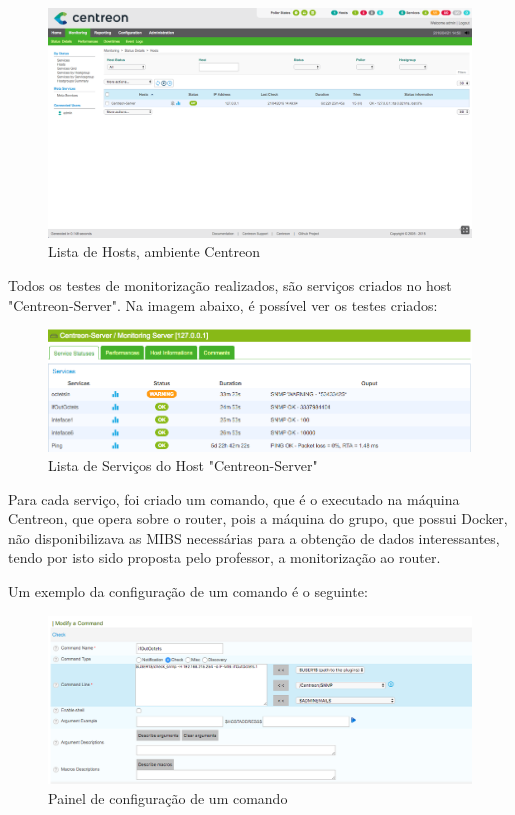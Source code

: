 \documentclass[pdftex,12pt,a4paper]{report}
\begin{document}
\begin{figure}[!htb]
\center
 \includegraphics[width=150mm,scale=1]{imagens/CentreonPrincipal.png}
 \caption{Lista de Hosts, ambiente Centreon}
 \label{fig:centreonPrincipal}
\end{figure}

\newpage
Todos os testes de monitorização realizados, são serviços criados no host "Centreon-Server". Na imagem abaixo, é possível ver os testes criados:

\begin{figure}[!htb]
\center
 \includegraphics[width=150mm,scale=1]{imagens/ServicesList.png}
 \caption{Lista de Serviços do Host "Centreon-Server"}
 \label{fig:centreonPrincipal}
\end{figure}

Para cada serviço, foi criado um comando, que é o executado na máquina Centreon, que opera sobre o router, pois a máquina do grupo, que possui Docker, não disponibilizava as MIBS necessárias para a obtenção de dados interessantes, tendo por isto sido proposta pelo professor, a monitorização ao router.

Um exemplo da configuração de um comando é o seguinte:

\begin{figure}[!htb]
\center
 \includegraphics[width=150mm,scale=1]{imagens/ConfiguracaoComando.png}
 \caption{Painel de configuração de um comando}
 \label{fig:comando}
\end{figure}
\end{document}
